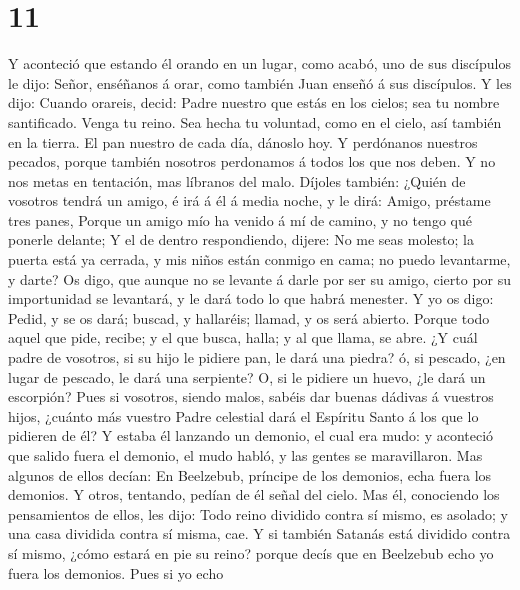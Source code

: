 \hypertarget{section-10}{%
\section{11}\label{section-10}}

 Y aconteció que estando él orando en un lugar, como acabó,
uno de sus discípulos le dijo: Señor, enséñanos á orar, como también
Juan enseñó á sus discípulos.  Y les dijo: Cuando orareis,
decid: Padre nuestro que estás en los cielos; sea tu nombre santificado.
Venga tu reino. Sea hecha tu voluntad, como en el cielo, así también en
la tierra.  El pan nuestro de cada día, dánoslo hoy.
 Y perdónanos nuestros pecados, porque también nosotros
perdonamos á todos los que nos deben. Y no nos metas en tentación, mas
líbranos del malo.  Díjoles también: ¿Quién de vosotros
tendrá un amigo, é irá á él á media noche, y le dirá: Amigo, préstame
tres panes,  Porque un amigo mío ha venido á mí de camino, y
no tengo qué ponerle delante;  Y el de dentro respondiendo,
dijere: No me seas molesto; la puerta está ya cerrada, y mis niños están
conmigo en cama; no puedo levantarme, y darte?  Os digo, que
aunque no se levante á darle por ser su amigo, cierto por su
importunidad se levantará, y le dará todo lo que habrá menester.
 Y yo os digo: Pedid, y se os dará; buscad, y hallaréis;
llamad, y os será abierto.  Porque todo aquel que pide,
recibe; y el que busca, halla; y al que llama, se abre.  ¿Y
cuál padre de vosotros, si su hijo le pidiere pan, le dará una piedra?
ó, si pescado, ¿en lugar de pescado, le dará una serpiente?
 O, si le pidiere un huevo, ¿le dará un escorpión?
 Pues si vosotros, siendo malos, sabéis dar buenas dádivas
á vuestros hijos, ¿cuánto más vuestro Padre celestial dará el Espíritu
Santo á los que lo pidieren de él?  Y estaba él lanzando un
demonio, el cual era mudo: y aconteció que salido fuera el demonio, el
mudo habló, y las gentes se maravillaron.  Mas algunos de
ellos decían: En Beelzebub, príncipe de los demonios, echa fuera los
demonios.  Y otros, tentando, pedían de él señal del cielo.
 Mas él, conociendo los pensamientos de ellos, les dijo:
Todo reino dividido contra sí mismo, es asolado; y una casa dividida
contra sí misma, cae.  Y si también Satanás está dividido
contra sí mismo, ¿cómo estará en pie su reino? porque decís que en
Beelzebub echo yo fuera los demonios.  Pues si yo echo
